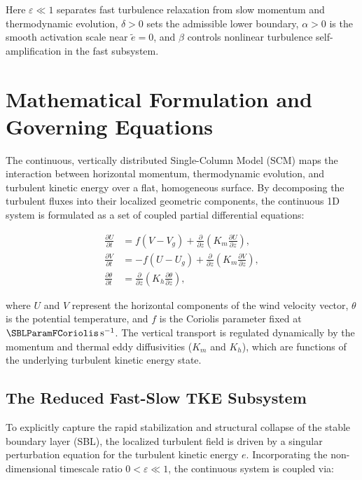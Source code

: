 \documentclass[11pt,letterpaper]{article}
\begin{document}
Here $\varepsilon \ll 1$ separates fast turbulence relaxation from slow momentum and thermodynamic evolution, $\delta>0$ sets the admissible lower boundary, $\alpha>0$ is the smooth activation scale near $\tilde e=0$, and $\beta$ controls nonlinear turbulence self-amplification in the fast subsystem.


\section{Mathematical Formulation and Governing Equations}
\label{sec:governing_equations}

The continuous, vertically distributed Single-Column Model (SCM) maps the interaction between horizontal momentum, thermodynamic evolution, and turbulent kinetic energy over a flat, homogeneous surface. By decomposing the turbulent fluxes into their localized geometric components, the continuous 1D system is formulated as a set of coupled partial differential equations:

\begin{align}
\frac{\partial U}{\partial t} &= f(V - V_g) + \frac{\partial}{\partial z} \left( K_m \frac{\partial U}{\partial z} \right), \label{eq:gov_u} \\
\frac{\partial V}{\partial t} &= -f(U - U_g) + \frac{\partial}{\partial z} \left( K_m \frac{\partial V}{\partial z} \right), \label{eq:gov_v} \\
\frac{\partial \theta}{\partial t} &= \frac{\partial}{\partial z} \left( K_h \frac{\partial \theta}{\partial z} \right), \label{eq:gov_theta}
\end{align}

where $U$ and $V$ represent the horizontal components of the wind velocity vector, $\theta$ is the potential temperature, and $f$ is the Coriolis parameter fixed at $\SBLParamFCoriolis\,\mathrm{s}^{-1}$. The vertical transport is regulated dynamically by the momentum and thermal eddy diffusivities ($K_m$ and $K_h$), which are functions of the underlying turbulent kinetic energy state.

\subsection{The Reduced Fast-Slow TKE Subsystem}
\label{subsec:gov_tke}

To explicitly capture the rapid stabilization and structural collapse of the stable boundary layer (SBL), the localized turbulent field is driven by a singular perturbation equation for the turbulent kinetic energy $e$. Incorporating the non-dimensional timescale ratio $0 < \varepsilon \ll 1$, the continuous system is coupled via:
\end{document}
